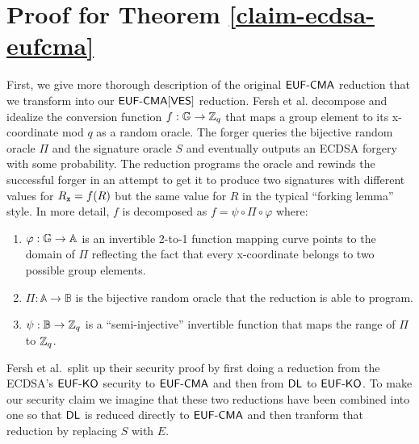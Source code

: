 
\section{ Proof for Theorem \ref{claim-ecdsa-eufcma}}
\label{proof-ecdsa-eufcma}
\newcommand{\psidomain}{\mathbb{B}}
\newcommand{\phirange}{\mathbb{A}}
\newcommand{\Sdleq}{\mathcal{S}_{\DLEQ}}
\newcommand{\B}{\mathcal{B}}

First, we give more thorough description of the original $\textsf{EUF-CMA}$ reduction that we transform into our $\textsf{EUF-CMA}[\textsf{VES}]$ reduction.
Fersh et al.\cite{ecdsa-eufcma} decompose and idealize the conversion function $f:\mathbb{G} \rightarrow \mathbb{Z}_q$ that maps a group element to its x-coordinate mod $q$ as a random oracle.
The forger queries the bijective random oracle $\Pi$ and the signature oracle $S$ and eventually outputs an ECDSA forgery with some probability.
The reduction programs the oracle and rewinds the successful forger in an attempt to get it to produce two signatures with different values for $R_{\mathtt{x}} = f(R)$ but the same value for $R$ in the typical ``forking lemma'' style\cite{pointcheval2000security}.
In more detail, $f$ is decomposed as $f = \psi \circ \Pi \circ \varphi$ where:

\begin{enumerate}
    \item $\varphi: \G \rightarrow \phirange$ is an invertible 2-to-1 function mapping curve points to the domain of $\Pi$ reflecting the fact that every x-coordinate belongs to two possible group elements.
    \item $\Pi: \phirange \rightarrow \psidomain$ is the bijective random oracle that the reduction is able to program.
    \item $\psi: \psidomain \rightarrow \ZZ_q$ is a ``semi-injective'' invertible function that maps the range of $\Pi$ to $\mathbb{Z}_q$.
\end{enumerate}

Fersh et al.\ split up their security proof by first doing a reduction from the ECDSA's $\textsf{EUF-KO}$ security to $\textsf{EUF-CMA}$ and then from $\textsf{DL}$ to $\textsf{EUF-KO}$.
To make our security claim we imagine that these two reductions have been combined into one so that $\textsf{DL}$ is reduced directly to $\textsf{EUF-CMA}$ and then tranform that reduction by replacing $S$ with $E$.


